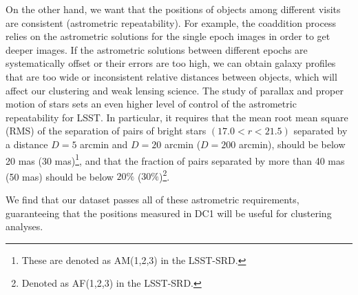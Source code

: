 \documentclass[a4paper,fleqn,usenatbib]{mnras}
\begin{document}
On the other hand, we want that the positions of objects among different visits are consistent (astrometric repeatability). For example, the coaddition process relies on the astrometric solutions for the single epoch images in order to get deeper images. If the astrometric solutions between different epochs are systematically offset or their errors are too high, we can obtain galaxy profiles that are too wide or inconsistent relative distances between objects, which will affect our clustering and weak lensing science. The study of parallax and proper motion of stars sets an even higher level of control of the astrometric repeatability for LSST. In particular, it requires that the mean root mean square (RMS) of the separation of pairs of bright stars $(17.0 < r < 21.5)$ separated by a distance $D=5$ arcmin and $D=20$ arcmin ($D=200$ arcmin), should be below 20 mas (30 mas)\footnote{These are denoted as AM(1,2,3) in the LSST-SRD.}, and that the fraction of pairs separated by more than 40 mas  (50 mas) should be below $20\%$ ($30\%$)\footnote{Denoted as AF(1,2,3) in the LSST-SRD.}. 



We find that our dataset passes all of these astrometric requirements, guaranteeing that the positions measured in DC1 will be useful for clustering analyses. 
\end{document}

